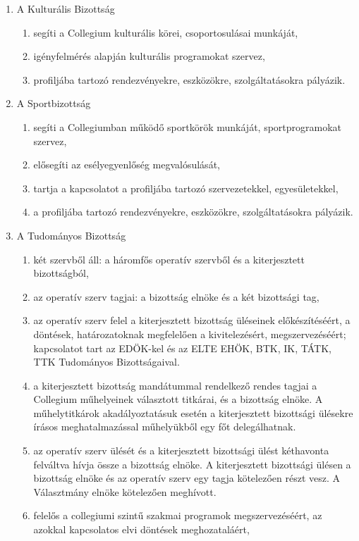 \documentclass{rulebook}
\begin{document}
\begin{enumerate}
\begin{enumerate}
	\end{enumerate}
	\item  A Kulturális Bizottság
	\begin{enumerate}	
		\item segíti a Collegium kulturális körei, csoportosulásai munkáját,
		\item igényfelmérés alapján kulturális programokat szervez,
		\item profiljába tartozó rendezvényekre, eszközökre, szolgáltatásokra pályázik.
	\end{enumerate}
	\item  A Sportbizottság
	\begin{enumerate}	
		\item segíti a Collegiumban működő sportkörök munkáját, sportprogramokat szervez,
		\item elősegíti az esélyegyenlőség megvalósulását,
		\item tartja a kapcsolatot a profiljába tartozó szervezetekkel, egyesületekkel,
		\item a profiljába tartozó rendezvényekre, eszközökre, szolgáltatásokra pályázik.
	\end{enumerate}
	\item  A Tudományos Bizottság
	\begin{enumerate}	
		\item két szervből áll: a háromfős operatív szervből és a kiterjesztett bizottságból,
	    \item az operatív szerv tagjai: a bizottság elnöke és a két bizottsági tag,
		\item az operatív szerv felel a kiterjesztett bizottság üléseinek előkészítéséért, a döntések, határozatoknak megfelelően a kivitelezésért, megszervezéséért; kapcsolatot tart az EDÖK-kel és az ELTE EHÖK, BTK, IK, TÁTK, TTK Tudományos Bizottságaival.
		\item a kiterjesztett bizottság mandátummal rendelkező rendes tagjai a Collegium műhelyeinek választott titkárai, és a bizottság elnöke. A műhelytitkárok akadályoztatásuk esetén a kiterjesztett bizottsági ülésekre írásos meghatalmazással műhelyükből egy főt delegálhatnak.
		\item az operatív szerv ülését és a kiterjesztett bizottsági ülést kéthavonta felváltva hívja össze a bizottság elnöke. A kiterjesztett bizottsági ülésen a bizottság elnöke és az operatív szerv egy tagja kötelezően részt vesz. A Választmány elnöke kötelezően meghívott.
		\item felelős a collegiumi szintű szakmai programok megszervezéséért, az azokkal kapcsolatos elvi döntések meghozataláért,

\end{enumerate}
\end{enumerate}
\end{document}
